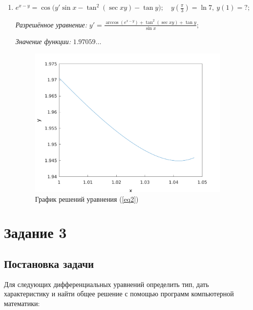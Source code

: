 \documentclass[14pt, a4paper, titlepage, fleqn]{extarticle}
\begin{document}
\begin{enumerate}
                \item \( e^{x-y} = \cos\big( y' \sin{x} - \tan^2(\sec{xy}) - \tan{y} \big); \quad y \left( \frac{\pi}{3} \right) = \ln 7, ~ y(1) = ?; \)
                    \label{eq2}

                    \textit{Разрешённое уравнение:}
                        \( y' = \frac{\arccos \left( e^{x-y} \right) + \tan^2 ( \sec{xy} ) + \tan y}{\sin x}; \)

                    \textit{Значение функции:}
                        \( 1.97059\dots \)

                    \begin{figure}[H]
                        \centering
                        \includegraphics[width=10cm]{pictures/graph2_2.pdf}
                        \caption{График решений уравнения (\ref{eq2})}
                    \end{figure}

                    \pagebreak
                    

            \end{enumerate}



    \pagebreak

    \section{Задание 3}
        \subsection{Постановка задачи}
            Для следующих дифференциальных уравнений определить тип, 
            дать характеристику и найти общее решение с помощью программ 
            компьютерной математики:
\end{document}
